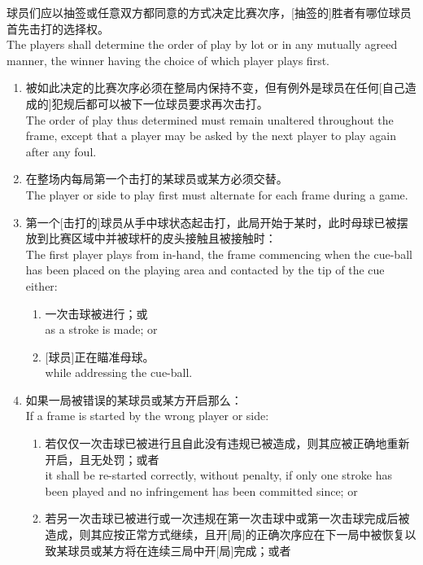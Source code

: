 \noindent 球员们应以抽签或任意双方都同意的方式决定比赛次序，[抽签的]胜者有哪位球员首先击打的选择权。\\
The players shall determine the order of play by lot or in any mutually agreed manner, the winner having the choice of which player plays first.
\begin{enumerate}[label=(\alph*)]
    \item 被如此决定的比赛次序必须在整局内保持不变，但有例外是球员在任何[自己造成的]犯规后都可以被下一位球员要求再次击打。\\
    The order of play thus determined must remain unaltered throughout the frame, except that a player may be asked by the next player to play again after any foul.
    \item 在整场内每局第一个击打的某球员或某方必须交替。\\
    The player or side to play first must alternate for each frame during a game.
    \item \label{2233c}第一个[击打的]球员从手中球状态起击打，此局开始于某时，此时母球已被摆放到比赛区域中并被球杆的皮头接触且被接触时：\\
    The first player plays from in-hand, the frame commencing when the cue-ball has been placed on the playing area and contacted by the tip of the cue either:
    \begin{enumerate}[label=(\roman*)]
        \item 一次击球被进行；或\\
        as a stroke is made; or
        \item ${}$[球员]正在瞄准母球。\\
        while addressing the cue-ball.
    \end{enumerate}
    \item \label{2233d}如果一局被错误的某球员或某方开启那么：\\
    If a frame is started by the wrong player or side:
    \begin{enumerate}[label=(\roman*)]
        \item 若仅仅一次击球已被进行且自此没有违规已被造成，则其应被正确地重新开启，且无处罚；或者\\
        it shall be re-started correctly, without penalty, if only one stroke has been played and no infringement has been committed since; or
        \item 若另一次击球已被进行或一次违规在第一次击球中或第一次击球完成后被造成，则其应按正常方式继续，且开[局]的正确次序应在下一局中被恢复以致某球员或某方将在连续三局中开[局]完成；或者\\

\end{enumerate}
\end{enumerate}
